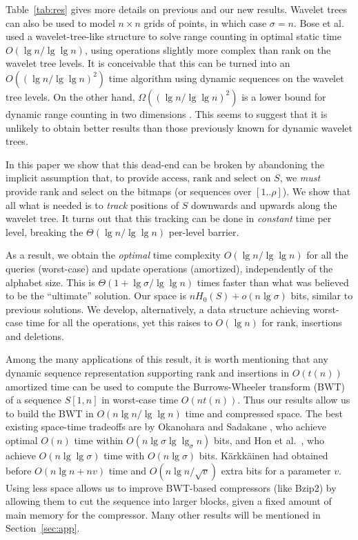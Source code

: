 \documentclass[11pt]{article}
\def\idrm#1{\ensuremath{\mathrm{#1}}}
\newcommand{\no}[1]{}
\newcommand{\ra}{\idrm{rank}}
\newcommand{\sel}{\idrm{select}}
\newcommand{\acc}{\idrm{access}}
\newcommand{\eps}{\varepsilon}
\begin{document}
Table~\ref{tab:res} gives more details on previous and our new results.
Wavelet trees can also be used to model $n \times n$ grids of points, in 
which case $\sigma=n$. Bose et al.~\cite{BHMM09} used a wavelet-tree-like
structure to solve range counting in optimal static time $O(\lg n / \lg\lg n)$,
using operations slightly more complex than rank on the wavelet tree levels.
It is conceivable that this can be turned into an $O((\lg n /\lg\lg n)^2)$
time algorithm using dynamic sequences on the wavelet tree levels. On the
other hand, $\Omega((\lg n / \lg\lg n)^2)$ is a lower bound for dynamic range
counting in two dimensions \cite{Pat07}. This seems to suggest that it is
unlikely to obtain better results than those previously known for dynamic 
wavelet trees.

In this paper we show that this dead-end can be broken by abandoning the
implicit assumption that, to provide $\acc$, $\ra$ and $\sel$ on $S$, we
{\em must} provide $\ra$ and $\sel$ on the bitmaps (or sequences over 
$[1..\rho]$). We show that
all what is needed is to {\em track} positions of $S$ downwards and upwards
along the wavelet tree. It turns out that this tracking can be done in 
{\em constant} time per level, breaking the $\Theta(\lg n / \lg\lg n)$ per-level
barrier.

As a result, we obtain the {\em optimal} time complexity
$O(\lg n/\lg\lg n)$ for all the queries (worst-case) and update operations
(amortized), independently of the alphabet size.
This is $\Theta(1+\lg\sigma/\lg\lg n)$ times faster 
than what was believed to be the ``ultimate'' solution. 
Our space is $nH_0(S) + o(n\lg\sigma)$ bits, similar to previous solutions.
We develop, alternatively, a data structure achieving worst-case time for all 
the operations, yet this raises to $O(\lg n)$ for $\ra$, insertions and 
deletions. 
\no{The set of operations can be extended to more general splitting,
concatenations, and block moves, at $O(\sigma\lg n)$ time cost per operation.
The only previous solution handling these operations \cite{NS10} achieved
$O(\sigma\lg^{1+\eps} n)$.}

Among the many applications of this result, it is worth mentioning that 
any dynamic sequence representation supporting $\ra$ and insertions in $O(t(n))$
amortized time can be used to compute the Burrows-Wheeler transform (BWT)
\cite{BW94} of a sequence $S[1,n]$ in worst-case time $O(n t(n))$. Thus our 
results allow us to build the BWT in $O(n\lg n/\lg\lg n)$ time and compressed
space. The best existing space-time tradeoffs are by Okanohara and Sadakane 
\cite{OS09}, who achieve optimal $O(n)$ time within 
$O(n \lg \sigma \lg\lg_\sigma n)$ bits, and Hon et al.~\cite{HSS09}, who 
achieve $O(n\lg\lg\sigma)$ time with $O(n\lg\sigma)$ bits. 
K\"arkk\"ainen \cite{Kar07} had obtained before $O(n\lg n + nv)$ time and
$O(n\lg n / \sqrt{v})$ extra bits for a parameter $v$.
Using less space
allows us to improve BWT-based compressors (like {\sc Bzip2}) by allowing them
to cut the sequence into larger blocks, given a fixed amount of main memory
for the compressor. 
Many other results will be mentioned in Section~\ref{sec:app}.
\end{document}
